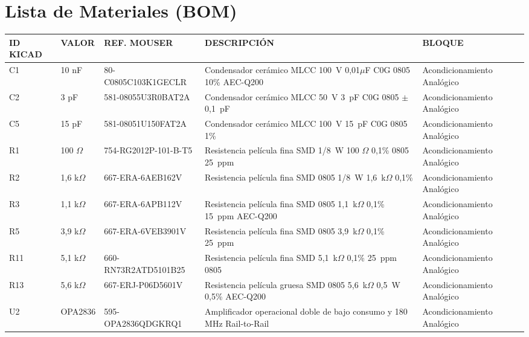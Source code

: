 \documentclass[12pt]{report} %
\begin{document}
\chapter{Lista de Materiales (BOM)}
\label{anexo:BOM}

\begin{table}[H]
    \centering
    \fontsize{10}{12}\selectfont
    \captionsetup{width=\textwidth}
    {\begin{tabular}{|P{1.5cm}|P{1.7cm}|P{3.2cm}|P{5.3cm}|P{2.7cm}|}
        \hline
        \textbf{ID KICAD} & \textbf{VALOR} & \textbf{REF. MOUSER} & \textbf{DESCRIPCIÓN} & \textbf{BLOQUE} \\
        \hline
        C1 & 10 nF & 80-C0805C103K1GECLR & Condensador cerámico MLCC 100~V 0,01$\mu$F C0G 0805 10\% AEC-Q200 & Acondicionamiento Analógico \\ \hline
        C2 & 3 pF & 581-08055U3R0BAT2A & Condensador cerámico MLCC 50~V 3~pF C0G 0805 $\pm$0,1~pF & Acondicionamiento Analógico \\ \hline
        C5 & 15 pF & 581-08051U150FAT2A & Condensador cerámico MLCC 100~V 15~pF C0G 0805 1\% & Acondicionamiento Analógico \\ \hline
        R1 & 100 $\Omega$ & 754-RG2012P-101-B-T5 & Resistencia película fina SMD 1/8~W 100 $\Omega$ 0,1\% 0805 25~ppm & Acondicionamiento Analógico \\ \hline
        R2 & 1{,}6 k$\Omega$ & 667-ERA-6AEB162V & Resistencia película fina SMD 0805 1/8~W 1,6~k$\Omega$ 0,1\% & Acondicionamiento Analógico \\ \hline
        R3 & 1{,}1 k$\Omega$ & 667-ERA-6APB112V & Resistencia película fina SMD 0805 1,1~k$\Omega$ 0,1\% 15~ppm AEC-Q200 & Acondicionamiento Analógico \\ \hline
        R5 & 3{,}9 k$\Omega$ & 667-ERA-6VEB3901V & Resistencia película fina SMD 0805 3,9~k$\Omega$ 0,1\% 25~ppm & Acondicionamiento Analógico \\ \hline
        R11 & 5{,}1 k$\Omega$ & 660-RN73R2ATD5101B25 & Resistencia película fina SMD 5,1~k$\Omega$ 0,1\% 25~ppm 0805 & Acondicionamiento Analógico \\ \hline
        R13 & 5{,}6 k$\Omega$ & 667-ERJ-P06D5601V & Resistencia película gruesa SMD 0805 5,6~k$\Omega$ 0,5~W 0,5\% AEC-Q200 & Acondicionamiento Analógico \\ \hline
        U2 & OPA2836 & 595-OPA2836QDGKRQ1 & Amplificador operacional doble de bajo consumo y 180 MHz Rail-to-Rail & Acondicionamiento Analógico \\ \hline
        

\end{tabular}}
\end{table}
\end{document}
